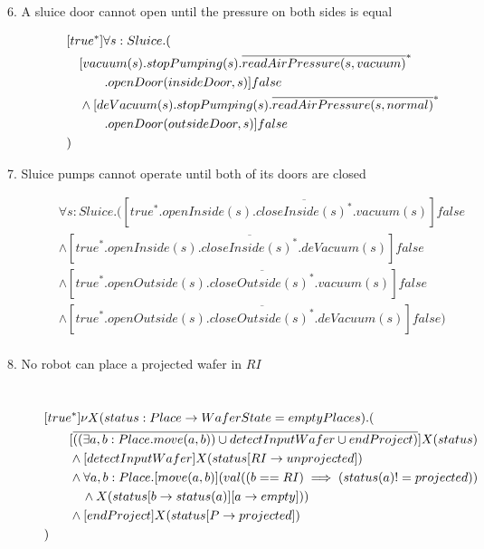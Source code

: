 \begin{description}
 \item[6. A sluice door cannot open until the pressure on both sides is equal]
	\begin{align*}
&[true^*]\forall s:Sluice . ( \\
&\tab  [vacuum(s).stopPumping(s).\overline{readAirPressure(s, vacuum)}^*\\
&\tab\tab\tab.openDoor(insideDoor,s)]false \\
&\tab  \wedge [deVacuum(s).stopPumping(s).\overline{readAirPressure(s, normal)}^*\\
&\tab\tab\tab.openDoor(outsideDoor,s)]false \\
&)		
	\end{align*}
	
 \item[7. Sluice pumps cannot operate until both of its doors are closed]
 
 \begin{align*}
		&\forall s:Sluice .([true^*.openInside(s).\overline{closeInside(s)^*}.vacuum(s)]false \\
		& \wedge [true^*.openInside(s).\overline{closeInside(s)^*}.deVacuum(s)]false \\
		& \wedge [true^*.openOutside(s).\overline{closeOutside(s)^*}.vacuum(s)]false \\
		& \wedge [true^*.openOutside(s).\overline{closeOutside(s)^*}.deVacuum(s)]false) \\
	\end{align*}

 \item[8. No robot can place a projected wafer in $RI$]\mbox{}\\
 
 \begin{align*}
&[true^*] \nu X(status:Place \to WaferState=emptyPlaces).(\\
  & \tab \tab [\overline{((\exists a,b:Place.move(a,b)) \cup detectInputWafer \cup endProject)}]X(status)\\
 & \tab \tab  \wedge [detectInputWafer]X(status[RI \to unprojected])\\
  & \tab \tab \wedge \forall a,b:Place.[move(a, b)](val((b == RI) \implies (status(a) != projected))\\
  & \tab \tab \tab \wedge X(status[b \to status(a)][a \to empty]))\\
  & \tab \tab \wedge [endProject]X(status[P \to projected])\\
&)
	\end{align*}


\end{description}
